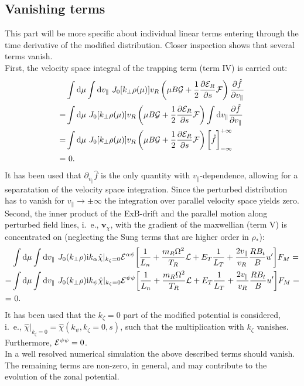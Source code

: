 \subsection{Vanishing terms}
This part will be more specific about individual linear terms entering through the time derivative of the modified distribution.
Closer inspection shows that several terms vanish.\\
%
First, the velocity space integral of the trapping term (term IV) is carried out:
\begin{align}
& \int \mathrm{d} \mu \int \mathrm{d} v_\parallel ~ J_0[k_\perp \rho(\mu) ] v_{R} \left(\mu B {\cal G} + {1 \over 2} \frac{\partial \mathcal{E}_R}{\partial s} {\cal F} \right) \frac{\partial \hat f}{\partial v_\parallel} \\
= & \int \mathrm{d} \mu  ~ J_0[k_\perp \rho(\mu) ]  v_{R} \left(\mu B {\cal G} + {1 \over 2} \frac{\partial \mathcal{E}_R}{\partial s} {\cal F} \right) \int \mathrm{d} v_\parallel \frac{\partial \hat f}{\partial v_\parallel} \\
= & \int \mathrm{d} \mu ~  J_0[k_\perp \rho(\mu) ]  v_{R} \left(\mu B {\cal G} + {1 \over 2} \frac{\partial \mathcal{E}_R}{\partial s} {\cal F} \right) \biggl[ \hat f\biggr]_{-\infty}^{+\infty} \\
= & ~0.
\end{align}
It has been used that $\partial_{v_\parallel} \hat f$ is the only quantity with $v_\parallel$-dependence, allowing for a separatation of the velocity space integration. 
Since the perturbed distribution has to vanish for $v_\parallel \rightarrow \pm \infty$ the integration over parallel velocity space yields zero. \\
%
Second, the inner product of the ExB-drift and the parallel motion along perturbed field lines, i.~e., $\mathbf{v}_\chi$, with the gradient of the maxwellian (term V) is concentrated on (neglecting the Sung terms that are higher order in $\rho_\ast$):
\begin{align}
& \int \mathrm{d} \mu \int \mathrm{d} v_\parallel ~J_0(k_\perp \rho) \mathrm{i}k_\alpha \hat \chi|_{k_\zeta = 0} {\cal E}^{\alpha \psi} \biggl [ {1 \over L_n} + {m_R \Omega ^2 \over T_R}{\cal L} + E_T {1 \over L_T} + {2 v_{\parallel} \over  v_{R}} {R B_t \over B} u^\prime \biggr ] F_{M} = \\
= & \int \mathrm{d} \mu \int \mathrm{d} v_\parallel ~ J_0(k_\perp \rho) \mathrm{i}k_\psi \hat \chi|_{k_\zeta = 0} {\cal E}^{\psi \psi} \biggl [ {1 \over L_n} + {m_R \Omega ^2 \over T_R}{\cal L} + E_T {1 \over L_T} + {2 v_{\parallel} \over  v_{R}} {R B_t \over B} u^\prime \biggr ] F_{M} = \\
= & ~ 0.
\end{align}
It has been used that the $k_\zeta = 0$ part of the modified potential is considered, i.~e., $\hat \chi|_{k_\zeta = 0} = \hat \chi (k_\psi, k_\zeta=0, s)$, such that the multiplication with $k_\zeta$ vanishes.
Furthermore, ${\cal E}^{\psi \psi} = 0$. \\
In a well resolved numerical simulation the above described terms should vanish.
The remaining terms are non-zero, in general, and may contribute to the evolution of the zonal potential.


